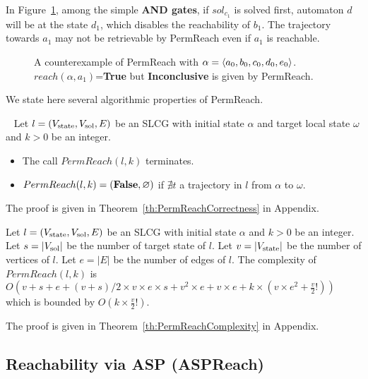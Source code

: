 \begin{example}\label{ex:counterPerm}
In Figure~\ref{FigConflictInForks}, among the simple \textbf{AND gates}, if $sol_{c_1}$ is solved first, automaton $d$ will be at the state $d_1$, which disables the reachability of $b_1$.
The trajectory towards $a_1$ may not be retrievable by PermReach even if $a_1$ is reachable.
\end{example}

\begin{figure}[ht]
\centering

\caption[Counterexample of PermReach]{A counterexample of PermReach with $\alpha=\langle a_0,b_0,c_0,d_0,e_0\rangle$. 
$reach(\alpha,a_1)$=\textbf{True} but \textbf{Inconclusive} is given by PermReach.
}\label{FigConflictInForks}
\end{figure}

We state here several algorithmic properties of PermReach.

\begin{theorem}~
    Let $l=(V_{\mathrm{state}}, V_{\mathrm{sol}}, E)$ be an SLCG with initial state $\alpha$ and target local state $\omega$ and $k > 0$ be an integer.
    \begin{itemize}
        \item The call $PermReach(l,k)$ terminates.
        \item $PermReach(l,k)=(\mathbf{False},\varnothing)$ if $\nexists t$ a trajectory in $l$ from $\alpha$ to $\omega$.
    \end{itemize}
    
    The proof is given in Theorem~\ref{th:PermReachCorrectness} in Appendix.
\end{theorem}

\begin{theorem}
    Let $l=(V_{\mathrm{state}},V_{\mathrm{sol}}, E)$ be an SLCG with initial state $\alpha$ and $k > 0$ be an integer.
    Let $s=|V_{\mathrm{sol}}|$ be the number of target state of $l$.
    Let $v = |V_{\mathrm{state}}|$ be the number of vertices of $l$.
    Let $e=|E|$ be the number of edges of $l$.
    The complexity of $PermReach(l,k)$ is $O(v + s + e + (v+s) / 2 \times v \times e \times s + v^{2} \times e + v \times e + k \times (v \times e^{2} + \frac{v}{2}!))$ which is bounded by $O(k \times \frac{v}{2}!)$.
    
    The proof is given in Theorem~\ref{th:PermReachComplexity} in Appendix.
\end{theorem}

\subsection{Reachability via ASP (ASPReach)}\label{sec:aspreach}


